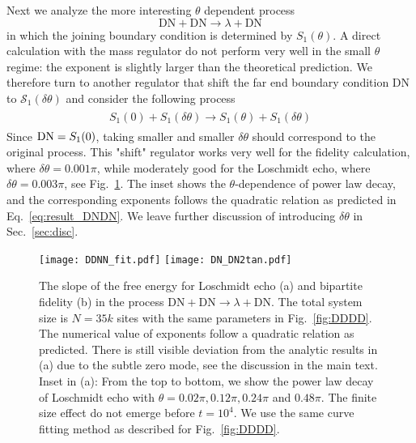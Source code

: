 Next we analyze the more interesting $\theta$ dependent process
\begin{equation}
  \text{DN}+\text{DN}\rightarrow\lambda+\text{DN}
\end{equation}
in which the joining boundary condition is determined by $S_1(\theta)$. A direct calculation with the mass regulator do not perform very well in the small $\theta$ regime: the exponent is slightly larger than the theoretical prediction. We therefore turn to another regulator that shift the far end boundary condition DN to $\mathcal{S}_1( \delta \theta )$ and consider the following process
\begin{eqnarray}\begin{aligned}
\label{eq:approx_DNDN}
S_1(0)+S_1(\delta\theta)\rightarrow S_1(\theta)+S_1(\delta\theta)
\end{aligned}\end{eqnarray}
Since ${\rm DN} = S_1 (0 )$, taking smaller and smaller $\delta \theta$ should correspond to the original process. This "shift" regulator works very well for the fidelity calculation, where $\delta \theta = 0.001 \pi$, while moderately good for the Loschmidt echo, where $\delta \theta = 0.003\pi$, see Fig.~\ref{fig:DDNN}. The inset shows the $\theta$-dependence of power law decay, and the corresponding exponents follows the quadratic relation as predicted in Eq.~\eqref{eq:result_DNDN}. We leave further discussion of introducing $\delta\theta$ in Sec.~\ref{sec:disc}. 

\begin{figure}
  \centering
\texttt{[image: DDNN\_fit.pdf]}
\texttt{[image: DN\_DN2tan.pdf]}
    \caption{The slope of the free energy for Loschmidt echo (a) and bipartite fidelity (b) in the process $\text{DN}+\text{DN}\rightarrow\lambda+\text{DN}$. The total system size is $N=35k$ sites with the same parameters in Fig.~\ref{fig:DDDD}. The numerical value of exponents follow a quadratic relation as predicted. There is still visible deviation from the analytic results in (a) due to the subtle zero mode, see the discussion in the main text. Inset in (a): From the top to bottom, we show the power law decay of Loschmidt echo with $\theta=0.02\pi, 0.12\pi, 0.24\pi$ and $0.48\pi$. The finite size effect do not emerge before $t=10^{4}$. We use the same curve fitting method as described for Fig.~\ref{fig:DDDD}.}
      \label{fig:DDNN}
\end{figure}

